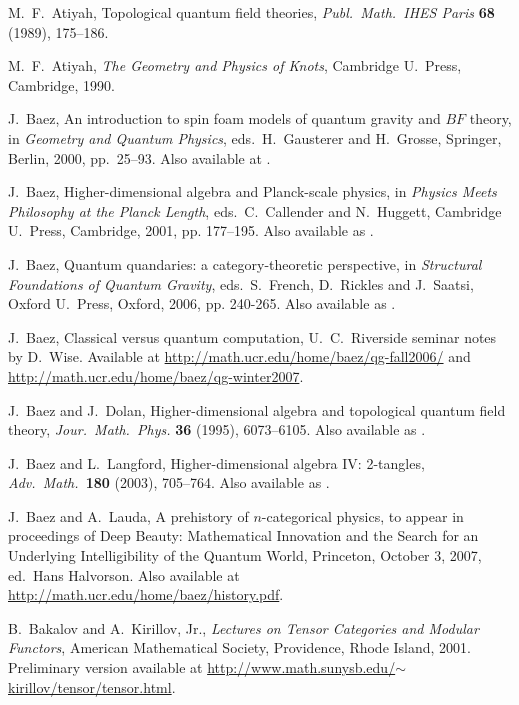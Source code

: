 \documentclass[12pt]{article}
\begin{document}
\begin{thebibliography}{99}
 M.\ F.\ Atiyah, Topological quantum field theories,
{\sl Publ.\ Math.\ IHES Paris} {\bf 68} (1989), 175--186.

M.\ F.\ Atiyah, {\sl The Geometry and Physics
of Knots}, Cambridge U.\ Press, Cambridge, 1990.

 J.\ Baez, An introduction to spin foam models of quantum
gravity and $BF$ theory, in {\sl Geometry and Quantum Physics}, eds.\
H.\ Gausterer and H.\ Grosse, Springer, Berlin, 2000, pp.\ 25--93.
Also available at \grqc{9905087}.

 J.\ Baez, Higher-dimensional algebra and Planck-scale
physics, in {\sl Physics Meets Philosophy at the Planck Length}, eds.\
C.\ Callender and N.\ Huggett, Cambridge U.\ Press, Cambridge,
2001, pp. 177--195.  Also available as \grqc{9902017}.

 J.\ Baez, Quantum quandaries: a category-theoretic
perspective, in {\sl Structural Foundations of Quantum Gravity}, eds.\
S.\ French, D.\ Rickles and J.\ Saatsi, Oxford U.\ Press, Oxford,
2006, pp. 240-265.  Also available as \quantph{0404040}.

\bibitem{Seminar} J.\ Baez, Classical versus quantum computation,
U.\ C.\ Riverside seminar notes by D.\ Wise.  Available at \hfill \break
\href{http://math.ucr.edu/home/baez/qg-fall2006/index.html#computation}{ http://math.ucr.edu/home/baez/qg-fall2006/} and \hfill \break \href{http://math.ucr.edu/home/baez/qg-winter2007/index.html#computation}{ http://math.ucr.edu/home/baez/qg-winter2007}.

\bibitem{BD} J.\ Baez and J.\ Dolan, Higher-dimensional algebra
and topological quantum field theory, {\sl Jour.\ Math.\ Phys.} {\bf 36}
(1995), 6073--6105.   Also available as .

\bibitem{HDA4} J.\ Baez and L.\ Langford, Higher-dimensional algebra
IV: 2-tangles, {\sl Adv.\ Math.\ }{\bf 180} (2003), 705--764.
Also available as .

\bibitem{BL} J.\ Baez and A.\ Lauda, A prehistory of $n$-categorical
physics, to appear in proceedings of Deep Beauty: Mathematical
Innovation and the Search for an Underlying Intelligibility of the
Quantum World, Princeton, October 3, 2007, ed.\ Hans Halvorson.
Also available at \href{http://math.ucr.edu/home/baez/history.pdf}{ 
http://math.ucr.edu/home/baez/history.pdf}.

\bibitem{BK} B.\ Bakalov and A.\ Kirillov, Jr., {\sl Lectures on 
Tensor Categories and Modular Functors}, American Mathematical
Society, Providence, Rhode Island, 2001.  Preliminary version available
at \href{http://www.math.sunysb.edu/~kirillov/tensor/tensor.html}{ http://www.math.sunysb.edu/$\sim$kirillov/tensor/tensor.html}.


\end{thebibliography}
\end{document}
